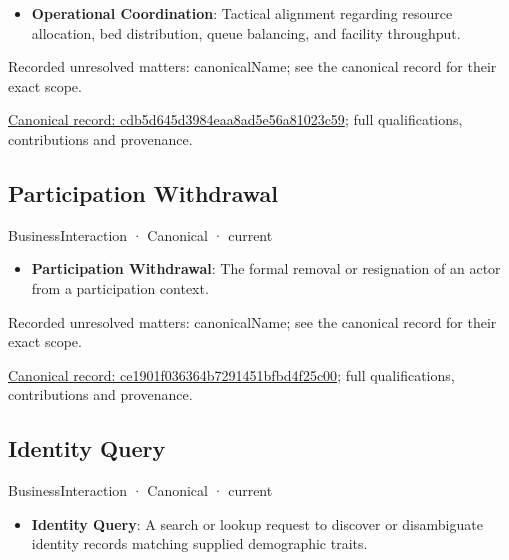 \begin{itemize}


\item \textbf{Operational Coordination}: Tactical alignment regarding resource allocation, bed distribution, queue balancing, and facility throughput.

\end{itemize}

{\small Recorded unresolved matters: canonicalName; see the canonical record for their exact scope.}\par
{\footnotesize \href{../../../../continuum/business/business-interaction/cdb5d645d3984eaa8ad5e56a81023c59.md}{Canonical record: cdb5d645d3984eaa8ad5e56a81023c59}; full qualifications, contributions and provenance.}\par
\subsection{Participation Withdrawal}

\label{element:ce1901f036364b7291451bfbd4f25c00}
{\small BusinessInteraction · Canonical · current}\par

\begin{itemize}


\item \textbf{Participation Withdrawal}: The formal removal or resignation of an actor from a participation context.

\end{itemize}

{\small Recorded unresolved matters: canonicalName; see the canonical record for their exact scope.}\par
{\footnotesize \href{../../../../continuum/business/business-interaction/ce1901f036364b7291451bfbd4f25c00.md}{Canonical record: ce1901f036364b7291451bfbd4f25c00}; full qualifications, contributions and provenance.}\par
\subsection{Identity Query}

\label{element:d119aa62e95f4d7aa01822401ca4203c}
{\small BusinessInteraction · Canonical · current}\par

\begin{itemize}


\item \textbf{Identity Query}: A search or lookup request to discover or disambiguate identity records matching supplied demographic traits.

\end{itemize}


